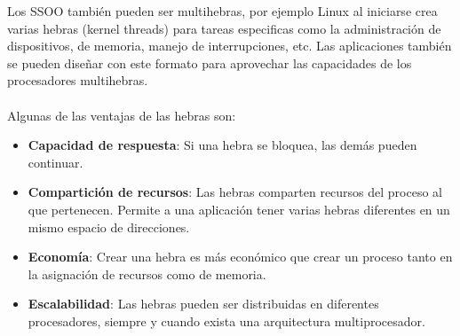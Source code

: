 \documentclass{templateNote}
\begin{document}
Los SSOO también pueden ser multihebras, por ejemplo Linux al iniciarse crea varias hebras (kernel threads) para tareas especificas como la administración de dispositivos, de memoria, manejo de interrupciones, etc.
Las aplicaciones también se pueden diseñar con este formato para aprovechar las capacidades de los procesadores multihebras. 
\\\\
Algunas de las ventajas de las hebras son: 
\begin{itemize}
    \item \textbf{Capacidad de respuesta}: Si una hebra se bloquea, las demás pueden continuar.
    \item \textbf{Compartición de recursos}: Las hebras comparten recursos del proceso al que pertenecen. Permite a una aplicación tener varias hebras diferentes en un mismo espacio de direcciones.
    \item \textbf{Economía}: Crear una hebra es más económico que crear un proceso tanto en la asignación de recursos como de memoria.
    \item \textbf{Escalabilidad}: Las hebras pueden ser distribuidas en diferentes procesadores, siempre y cuando exista una arquitectura multiprocesador.
\end{itemize}
\end{document}
